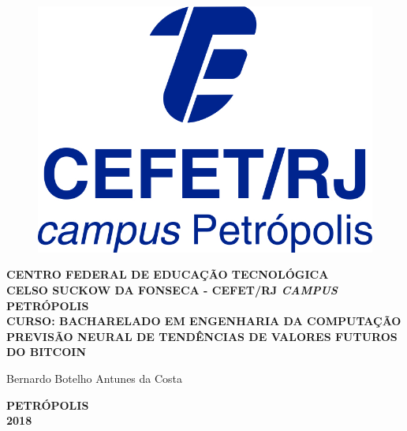 \begin{figure}
\center
\includegraphics[height=0.15\textwidth]{Figs/logoCefetCampusPetropolis.jpg} 
\end{figure}


\vspace*{0.8cm}

\begin{center}
{\large \bf CENTRO FEDERAL DE EDUCAÇÃO TECNOLÓGICA} \vspace{1mm} \\
{\large \bf CELSO SUCKOW DA FONSECA - CEFET/RJ \textit{CAMPUS} PETRÓPOLIS} \vspace{1mm} \\
{\large \bf CURSO: BACHARELADO EM ENGENHARIA DA COMPUTAÇÃO}\\

\vspace*{5cm}
{\large \bf PREVISÃO NEURAL DE TENDÊNCIAS DE VALORES FUTUROS DO BITCOIN}\\
\end{center}
\vspace{4cm}
\hfill
	\begin{flushright}
	Bernardo Botelho Antunes da Costa
	\end{flushright}


\vspace*{3.3cm}
\begin{center}
{\bf PETRÓPOLIS \\ 2018}\\
\end{center}

\newpage
\pagestyle{empty}

